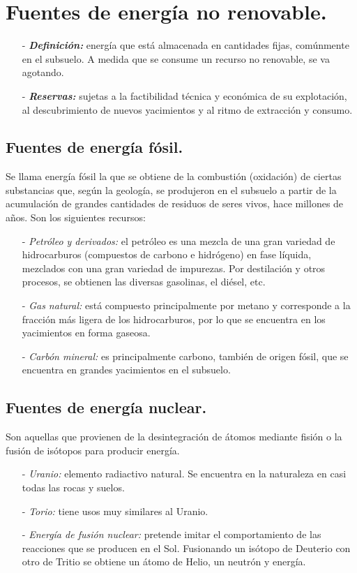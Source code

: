 		
\section{Fuentes de energía no renovable.}
	\begin{itemize}
		\item[-] \textbf{\textit{Definición:}} 
			energía que está almacenada en cantidades fijas, comúnmente en
			el subsuelo. A medida que se consume un recurso no renovable, se va agotando.
		\item[-] \textbf{\textit{Reservas:}}
			sujetas a la factibilidad técnica y económica de su explotación, al
			descubrimiento de nuevos yacimientos y al ritmo de extracción y consumo.
	\end{itemize}
	
		\subsection{Fuentes de energía fósil.}
			Se llama energía fósil la que se obtiene de la combustión (oxidación) de ciertas substancias que,
			según la geología, se produjeron en el subsuelo a partir de la acumulación de grandes cantidades de
			residuos de seres vivos, hace millones de años. Son los siguientes recursos:
			\begin{itemize}
				\item[-] \textit{Petróleo y derivados:}
					el petróleo es una mezcla de una gran variedad de hidrocarburos
					(compuestos de carbono e hidrógeno) en fase líquida, mezclados con una gran variedad de
					impurezas. Por destilación y otros procesos, se obtienen las diversas gasolinas, el diésel, etc.
				\item[-] \textit{Gas natural:} 
					está compuesto principalmente por metano y corresponde a la
					fracción más ligera de los hidrocarburos, por lo que se encuentra en los yacimientos en forma
					gaseosa.
				\item[-] \textit{Carbón mineral:}
					es principalmente carbono, también de origen fósil, que
					se encuentra en grandes yacimientos en el subsuelo.
			\end{itemize}
			
		\subsection{Fuentes de energía nuclear.}
			Son aquellas que provienen de la desintegración de átomos mediante fisión o la fusión de isótopos para producir energía.
			\begin{itemize}
				\item[-] \textit{Uranio:}
					elemento radiactivo natural. Se encuentra en la naturaleza en casi
					todas las rocas y suelos.
				\item[-] \textit{Torio:}
					tiene usos muy similares al Uranio.
				\item[-] \textit{Energía de fusión nuclear:} 
					pretende imitar el comportamiento de las reacciones que se producen en el Sol. Fusionando un isótopo de Deuterio con otro de Tritio se obtiene un átomo de Helio, un neutrón y energía.
			\end{itemize}
		
